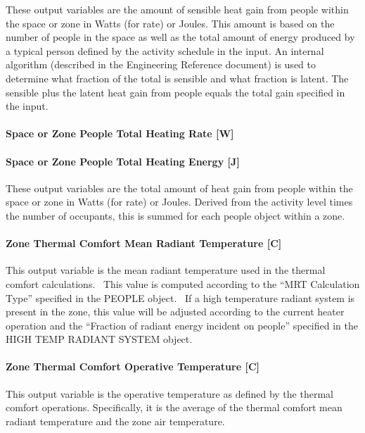 These output variables are the amount of sensible heat gain from people within the space or zone in Watts (for rate) or Joules. This amount is based on the number of people in the space as well as the total amount of energy produced by a typical person defined by the activity schedule in the input. An internal algorithm (described in the Engineering Reference document) is used to determine what fraction of the total is sensible and what fraction is latent. The sensible plus the latent heat gain from people equals the total gain specified in the input.

\paragraph{Space or Zone People Total Heating Rate {[}W{]}}\label{zone-people-total-heating-rate-w}

\paragraph{Space or Zone People Total Heating Energy {[}J{]}}\label{zone-people-total-heating-energy-j}

These output variables are the total amount of heat gain from people within the space or zone in Watts (for rate) or Joules. Derived from the activity level times the number of occupants, this is summed for each people object within a zone.

\paragraph{Zone Thermal Comfort Mean Radiant Temperature {[}C{]}}\label{zone-thermal-comfort-mean-radiant-temperature-c}

This output variable is the mean radiant temperature used in the thermal comfort calculations.~ This value is computed according to the ``MRT Calculation Type'' specified in the PEOPLE object.~ If a high temperature radiant system is present in the zone, this value will be adjusted according to the current heater operation and the ``Fraction of radiant energy incident on people'' specified in the HIGH TEMP RADIANT SYSTEM object.

\paragraph{Zone Thermal Comfort Operative Temperature {[}C{]}}\label{zone-thermal-comfort-operative-temperature-c}

This output variable is the operative temperature as defined by the thermal comfort operations. Specifically, it is the average of the thermal comfort mean radiant temperature and the zone air temperature.

